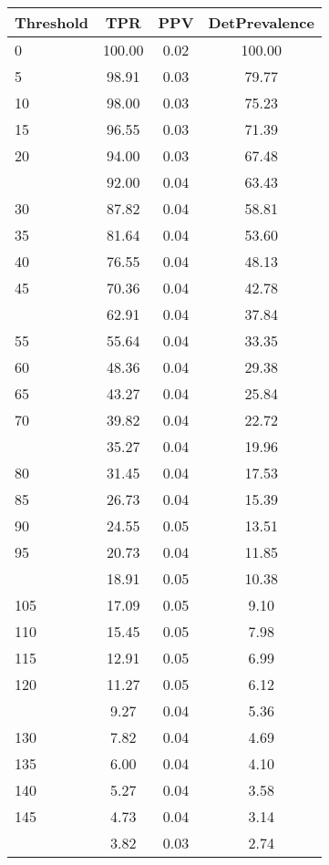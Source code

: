 \begin{table}[ht]
\centering
\begin{tabular}{lccc}
  \toprule
Threshold & TPR & PPV & DetPrevalence \\ 
  \midrule
0 & 100.00 & 0.02 & 100.00 \\ 
  5 & 98.91 & 0.03 & 79.77 \\ 
  10 & 98.00 & 0.03 & 75.23 \\ 
  15 & 96.55 & 0.03 & 71.39 \\ 
  20 & 94.00 & 0.03 & 67.48 \\ 
   \addlinespace
25 & 92.00 & 0.04 & 63.43 \\ 
  30 & 87.82 & 0.04 & 58.81 \\ 
  35 & 81.64 & 0.04 & 53.60 \\ 
  40 & 76.55 & 0.04 & 48.13 \\ 
  45 & 70.36 & 0.04 & 42.78 \\ 
   \addlinespace
50 & 62.91 & 0.04 & 37.84 \\ 
  55 & 55.64 & 0.04 & 33.35 \\ 
  60 & 48.36 & 0.04 & 29.38 \\ 
  65 & 43.27 & 0.04 & 25.84 \\ 
  70 & 39.82 & 0.04 & 22.72 \\ 
   \addlinespace
75 & 35.27 & 0.04 & 19.96 \\ 
  80 & 31.45 & 0.04 & 17.53 \\ 
  85 & 26.73 & 0.04 & 15.39 \\ 
  90 & 24.55 & 0.05 & 13.51 \\ 
  95 & 20.73 & 0.04 & 11.85 \\ 
   \addlinespace
100 & 18.91 & 0.05 & 10.38 \\ 
  105 & 17.09 & 0.05 & 9.10 \\ 
  110 & 15.45 & 0.05 & 7.98 \\ 
  115 & 12.91 & 0.05 & 6.99 \\ 
  120 & 11.27 & 0.05 & 6.12 \\ 
   \addlinespace
125 & 9.27 & 0.04 & 5.36 \\ 
  130 & 7.82 & 0.04 & 4.69 \\ 
  135 & 6.00 & 0.04 & 4.10 \\ 
  140 & 5.27 & 0.04 & 3.58 \\ 
  145 & 4.73 & 0.04 & 3.14 \\ 
   \addlinespace
150 & 3.82 & 0.03 & 2.74 \\ 

\end{tabular}
\end{table}
